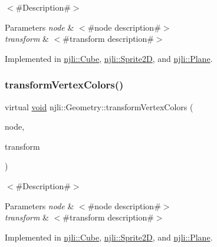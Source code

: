 $<$\#\+Description\#$>$


\begin{DoxyParams}{Parameters}
{\em node} & $<$\#node description\#$>$ \\
\hline
{\em transform} & $<$\#transform description\#$>$ \\
\hline
\end{DoxyParams}


Implemented in \mbox{\hyperlink{classnjli_1_1_cube_af656eb95de72d96c48d9be85d3801763}{njli\+::\+Cube}}, \mbox{\hyperlink{classnjli_1_1_sprite2_d_a61249eccaef1845855b6c1165bb1d1cf}{njli\+::\+Sprite2D}}, and \mbox{\hyperlink{classnjli_1_1_plane_a39afa45eb73d3c9a84d5a814d58ea963}{njli\+::\+Plane}}.

\mbox{\label{classnjli_1_1_geometry_a1169257a4241392cec0a23c922f148f3}} 
\subsubsection{\texorpdfstring{transform\+Vertex\+Colors()}{transformVertexColors()}}
{\footnotesize\ttfamily virtual \mbox{\hyperlink{_thread_8h_af1e856da2e658414cb2456cb6f7ebc66}{void}} njli\+::\+Geometry\+::transform\+Vertex\+Colors (\begin{DoxyParamCaption}\item[{\mbox{\hyperlink{classnjli_1_1_node}{Node}} $\ast$}]{node,  }\item[{const bt\+Transform \&}]{transform }\end{DoxyParamCaption})\hspace{0.3cm}{\ttfamily [pure virtual]}}

$<$\#\+Description\#$>$


\begin{DoxyParams}{Parameters}
{\em node} & $<$\#node description\#$>$ \\
\hline
{\em transform} & $<$\#transform description\#$>$ \\
\hline
\end{DoxyParams}


Implemented in \mbox{\hyperlink{classnjli_1_1_cube_a2a2d30322a9d48d0521fedbba3072a80}{njli\+::\+Cube}}, \mbox{\hyperlink{classnjli_1_1_sprite2_d_a9faa5df865ca871af37dea98682a52a2}{njli\+::\+Sprite2D}}, and \mbox{\hyperlink{classnjli_1_1_plane_a918065b54d466a43fe4c56688a9f0ee2}{njli\+::\+Plane}}.

